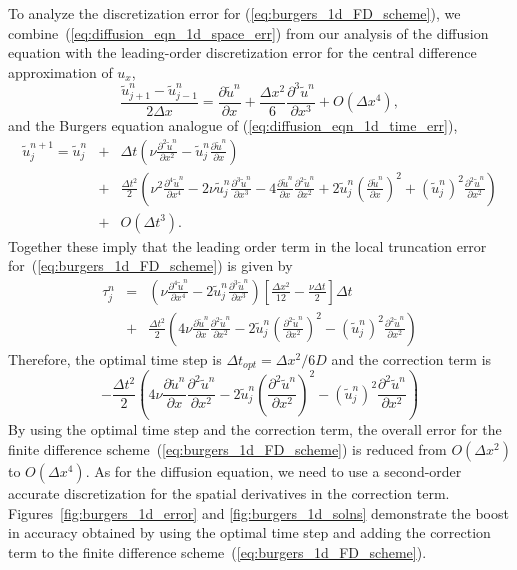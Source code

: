 \documentclass[fleqn,12pt,twoside]{article}
\newcommand{\beq}{\begin{equation}}
\newcommand{\eeq}{\end{equation}}
\newcommand{\bea}{\begin{eqnarray}}
\newcommand{\eea}{\end{eqnarray}}
\def\px{\partial x}
\def\tu{\tilde{u}}
\def\dt{\Delta t}
\def\dx{\Delta x}
\def\dto{\dt_{opt}}
\begin{document}
To analyze the discretization error for (\ref{eq:burgers_1d_FD_scheme}), 
we combine~(\ref{eq:diffusion_eqn_1d_space_err}) from our analysis of 
the diffusion equation with the leading-order discretization error for 
the central difference approximation of $u_x$,
\beq
  \frac{\tu^{n}_{j+1} - \tu^{n}_{j-1}}{2 \dx}  =
  \frac{\partial \tu^n}{\px} 
  + \frac{\dx^2}{6} \frac{\partial^3 \tu^n}{\px^3} 
  + O(\dx^4),
  \label{eq:burgers_1d_ux_err}
\eeq
and the Burgers equation analogue of (\ref{eq:diffusion_eqn_1d_time_err}),
\bea
  \tu^{n+1}_j = \tu^{n}_j 
    &+& \dt \left( \nu \frac{\partial^2 \tu^n}{\px^2} 
                 - \tu^{n}_j \frac{\partial \tu^n}{\px} \right)
    \nonumber \\
    &+& \frac{\dt^2}{2} 
        \left( \nu^2 \frac{\partial^4 \tu^n}{\px^4} 
             - 2 \nu \tu^n_j\frac{\partial^3 \tu^n}{\px^3} 
             - 4 \frac{\partial \tu^n}{\px} \frac{\partial^2 \tu^n}{\px^2} 
             + 2 \tu^n_j \left(\frac{\partial \tu^n}{\px} \right)^2
             + \left(\tu^n_j\right)^2 \frac{\partial^2 \tu^n}{\px^2} 
        \right) 
    \nonumber \\
    &+& O \left( \dt^3 \right).
    \label{eq:burgers_1d_time_err}
\eea
Together these imply that the leading order term in the local truncation error 
for~(\ref{eq:burgers_1d_FD_scheme}) is given by
\bea
  \tau^n_j &=&
      \left( \nu \frac{\partial^4 \tu^n}{\px^4} 
           - 2 \tu^n_j \frac{\partial^3 \tu^n}{\px^3} \right)
      \left[ \frac{\dx^2}{12} - \frac{\nu \dt}{2}  \right] \dt
  \nonumber \\
  &+& \frac{\dt^2}{2} 
      \left( 
           4 \nu \frac{\partial \tu^n}{\px} \frac{\partial^2 \tu^n}{\px^2}
         - 2 \tu^n_j \left( \frac{\partial^2 \tu^n}{\px^2} \right)^2
         - \left(\tu^n_j\right)^2 \frac{\partial^2 \tu^n}{\px^2}
      \right)
  \label{eq:burgers_1d_err_eqn}
\eea
Therefore, the optimal time step is $\dto = \dx^2/6D$ and the correction term 
is
\beq
  - \frac{\dt^2}{2} 
      \left( 
           4 \nu \frac{\partial \tu^n}{\px} \frac{\partial^2 \tu^n}{\px^2}
         - 2 \tu^n_j \left( \frac{\partial^2 \tu^n}{\px^2} \right)^2
         - \left(\tu^n_j\right)^2 \frac{\partial^2 \tu^n}{\px^2}
      \right)
  \label{eq:burgers_1d_corr_term}
\eeq 
By using the optimal time step and the correction term, the overall error
for the finite difference scheme~(\ref{eq:burgers_1d_FD_scheme}) is reduced
from $O(\dx^2)$ to $O(\dx^4)$.  As for the diffusion equation, we need
to use a second-order accurate discretization for the spatial derivatives
in the correction term.  
Figures~\ref{fig:burgers_1d_error} and \ref{fig:burgers_1d_solns} demonstrate 
the boost in accuracy obtained by using the optimal time step and adding the
correction term to the finite difference 
scheme~(\ref{eq:burgers_1d_FD_scheme}).
\end{document}
